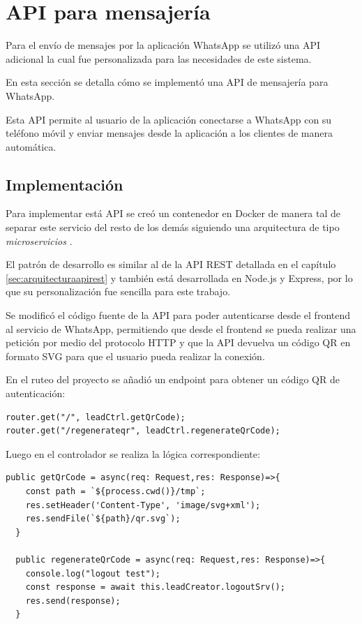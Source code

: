 \section{API para mensajería}
\label{sec:apimessenger}

Para el envío de mensajes por la aplicación WhatsApp \cite{whatsapp} se utilizó una API adicional \cite{api-whatsapp-ts} la cual fue personalizada para las necesidades de este sistema.

En esta sección se detalla cómo se implementó una API de mensajería para WhatsApp.

Esta API permite al usuario de la aplicación conectarse a WhatsApp con su teléfono móvil y enviar mensajes desde la aplicación a los clientes de manera automática.

\subsection{Implementación}
\label{subsec:apimessengerimplementación}

Para implementar está API se creó un contenedor en Docker de manera tal de separar este servicio del resto de los demás siguiendo una arquitectura de tipo \textit{microservicios} \cite{microservices-docs}.

El patrón de desarrollo es similar al de la API REST detallada en el capítulo \ref{sec:arquitecturaapirest} y también está desarrollada en Node.js y Express, por lo que su personalización fue sencilla para este trabajo.

Se modificó el código fuente de la API para poder autenticarse desde el frontend al servicio de WhatsApp, permitiendo que desde el frontend se pueda realizar una petición por medio del protocolo HTTP y que la API devuelva un código QR \cite{qr-code} en formato SVG \cite{svg-format} para que el usuario pueda realizar la conexión. 

En el ruteo del proyecto se añadió un endpoint para obtener un código QR de autenticación:

\begin{lstlisting}[label=cod:apimessengerroute,caption=Endpoint para obtener código QR.]
router.get("/", leadCtrl.getQrCode);
router.get("/regenerateqr", leadCtrl.regenerateQrCode);
\end{lstlisting}

Luego en el controlador se realiza la lógica correspondiente:

\begin{lstlisting}[label=cod:apimessengercontroller,caption=Controlador de ruta para obtener código QR.]
  public getQrCode = async(req: Request,res: Response)=>{
    const path = `${process.cwd()}/tmp`;
    res.setHeader('Content-Type', 'image/svg+xml');
    res.sendFile(`${path}/qr.svg`);
  }

  public regenerateQrCode = async(req: Request,res: Response)=>{
    console.log("logout test");
    const response = await this.leadCreator.logoutSrv();
    res.send(response);
  }
\end{lstlisting}

